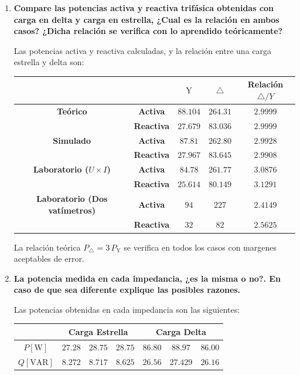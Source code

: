 \documentclass[letter,11pt]{article}
\begin{document}
\begin{enumerate}

\item \textbf{Compare las potencias activa y reactiva trifásica obtenidas con
carga en delta y carga en estrella, ¿Cual es la relación en ambos casos? ¿Dicha
relación se verifica con lo aprendido teóricamente?}

Las potencias activa y reactiva calculadas, y la relación entre una carga
estrella y delta son:

\begin{center}
    \begin{tabular}{|c|c||c|c||c|}
    \hline
    \multicolumn{2}{|c||}{} & $\text{Y}$ & $\triangle$ & Relación $\triangle/Y$
    \tabularnewline \hline \hline
    \textbf{Teórico} & \textbf{Activa} &
    $88.104$ & $264.31$ & $2.9999$
    \tabularnewline \hline
    & \textbf{Reactiva} &
    $27.679$ & $83.036$ & $2.9999$
    \tabularnewline \hline \hline
    \textbf{Simulado} & \textbf{Activa} &
    $87.81$ & $262.80$ & $2.9928$
    \tabularnewline \hline
    & \textbf{Reactiva} &
    $27.967$ & $83.645$ & $2.9908$
    \tabularnewline \hline \hline
    \textbf{Laboratorio ($U{\times}I$)} & \textbf{Activa} &
    $84.78$ & $261.77$ & $3.0876$
    \tabularnewline \hline
    & \textbf{Reactiva} &
    $25.614$ & $80.149$ & $3.1291$
    \tabularnewline \hline \hline
    \textbf{Laboratorio (Dos vatímetros)} & \textbf{Activa} &
    $94$ & $227$ & $2.4149$
    \tabularnewline \hline
    & \textbf{Reactiva} &
    $32$ & $82$ & $2.5625$
    \tabularnewline \hline
    \end{tabular}
\end{center}

La relación teórica $P_\triangle = 3\,P_{\text{Y}}$ se verifica en todos los
casos con margenes aceptables de error.

\item \textbf{La potencia medida en cada impedancia, ¿es la misma o no?. En caso
de que sea diferente explique las posibles razones.}

Las potencias obtenidas en cada impedancia son las siguientes:

\begin{center}
    \begin{tabular}{|c||c|c|c||c|c|c|}
    \hline
    & \multicolumn{3}{|c||}{\textbf{Carga Estrella}} &
    \multicolumn{3}{|c|}{\textbf{Carga Delta}}
    \tabularnewline \hline \hline
    $P[\text{W}]$ &
    $27.28$ & $28.75$ & $28.75$ & $86.80$ & $88.97$ & $86.00$
    \tabularnewline \hline
    $Q[\text{VAR}]$ &
    $8.272$ & $ 8.717$ & $ 8.625$ & $26.56$ & $27.429$ & $26.16$
    \tabularnewline \hline
    \end{tabular}
\end{center}


\end{enumerate}
\end{document}
